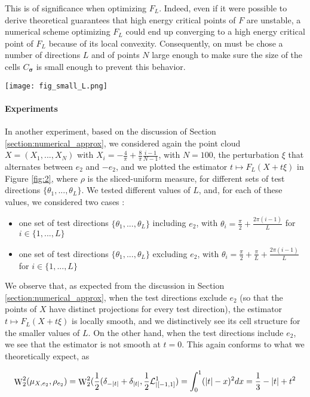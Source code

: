 This is of significance when optimizing $F_L$. Indeed, even if it were possible to derive theoretical guarantees that high energy critical points of $F$ are unstable, a numerical scheme optimizing $F_L$ could end up converging to a high energy critical point of $F_L$ because of its local convexity. Consequently, on must be chose a number of directions $L$ and of points $N$ large enough to make sure the size of the cells $C_{\bm{\sigma}}$ is small enough to prevent this behavior. 

\begin{figure*}[t]
    \vskip 0.2in
    \begin{center}
        \centerline{\texttt{[image: fig\_small\_L.png]}}
        \caption{Behavior of $F_L$ for different sets of test directions. Depicts the value of $F_L(X+t\xi)$, where $X$ is a point cloud of $N = 100$ points uniformly distributed on the segment $[-4/\pi,4/\pi] \times \{0\}$, $\xi$ alternates between $e_2$ and $-e_2$, and $\rho$ is the sliced-uniform distribution. Each column corresponds to a different number $L \in \{10,20,40,100\}$ of fixed test directions ; on the top line $e_2$ is included in the test directions while on the bottom line it is excluded}
    \end{center}
    \label{fig:2}
    \vskip -0.2in
\end{figure*}

\paragraph{Experiments} In another experiment, based on the discussion of Section \ref{section:numerical_approx}, we considered again the point cloud $X = (X_1,...,X_N)$ with $X_i = -\frac{4}{\pi} + \frac{8}{\pi}\frac{i-1}{N-1}$, with $N = 100$, the perturbation $\xi$ that alternates between $e_2$ and $-e_2$, and we plotted the estimator $t \mapsto F_L(X+t\xi)$ in Figure \ref{fig:2}, where $\rho$ is the sliced-uniform measure, for different sets of test directions $\{\theta_1,...,\theta_L\}$. We tested different values of $L$, and, for each of these values, we considered two cases :

\begin{itemize}
    \item one set of test directions $\{\theta_1,...,\theta_L\}$ including $e_2$, with $\theta_i = \frac{\pi}{2} + \frac{2\pi(i-1)}{L}$ for $i \in \{1,...,L\}$
    \item one set of test directions $\{\theta_1,...,\theta_L\}$ excluding $e_2$, with $\theta_i = \frac{\pi}{2} + \frac{\pi}{L} + \frac{2\pi(i-1)}{L}$ for $i \in \{1,...,L\}$ 
\end{itemize}
We observe that, as expected from the discussion in Section \ref{section:numerical_approx}, when the test directions exclude $e_2$ (so that the points of $X$ have distinct projections for every test direction), the estimator $t \mapsto F_L(X+t\xi)$ is locally smooth, and we distinctively see its cell structure for the smaller values of $L$. On the other hand, when the test directions include $e_2$, we see that the estimator is not smooth at $t = 0$. This again conforms to what we theoretically expect, as 

\begin{equation}\mathop{\mathrm{W}}\nolimits^2_2(\mu_{X,e_2}, \rho_{e_2}) = \mathop{\mathrm{W}}\nolimits^2_2(\frac{1}{2} (\delta_{-|t|} + \delta_{|t|}, \frac{1}{2} \mathcal L^1_{|[-1,1]}) = \int_0^1 (|t| - x)^2 dx = \frac{1}{3} - |t| + t^2 \end{equation}

